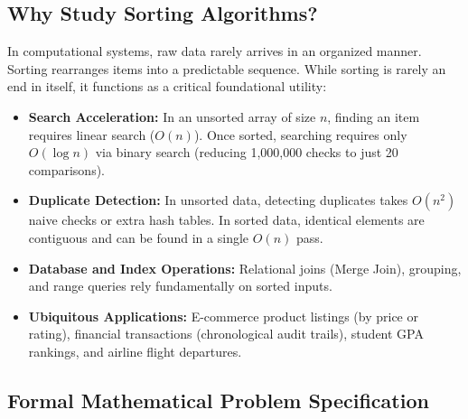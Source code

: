 \documentclass[11pt,a4paper]{article}
\begin{document}
\subsection{Why Study Sorting Algorithms?}
In computational systems, raw data rarely arrives in an organized manner. Sorting rearranges items into a predictable sequence. While sorting is rarely an end in itself, it functions as a critical foundational utility:
\begin{itemize}[itemsep=2pt]
    \item \textbf{Search Acceleration:} In an unsorted array of size $n$, finding an item requires linear search ($O(n)$). Once sorted, searching requires only $O(\log n)$ via binary search (reducing 1,000,000 checks to just 20 comparisons).
    \item \textbf{Duplicate Detection:} In unsorted data, detecting duplicates takes $O(n^2)$ naive checks or extra hash tables. In sorted data, identical elements are contiguous and can be found in a single $O(n)$ pass.
    \item \textbf{Database and Index Operations:} Relational joins (Merge Join), grouping, and range queries rely fundamentally on sorted inputs.
    \item \textbf{Ubiquitous Applications:} E-commerce product listings (by price or rating), financial transactions (chronological audit trails), student GPA rankings, and airline flight departures.
\end{itemize}

\begin{center}
\end{center}

\subsection{Formal Mathematical Problem Specification}
\end{document}
